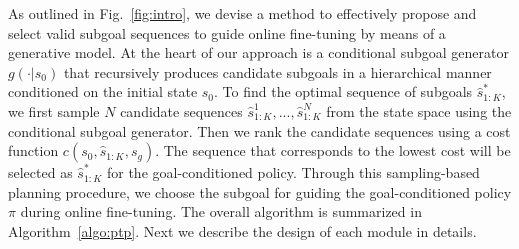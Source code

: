 
As outlined in Fig.~\ref{fig:intro}, we devise a method to effectively propose and select valid subgoal sequences to guide online fine-tuning by means of a generative model. At the heart of our approach is a conditional subgoal generator $g(\cdot | s_0)$ that recursively produces candidate subgoals in a hierarchical manner conditioned on the initial state $s_0$. To find the optimal sequence of subgoals $\hat{s}_{1:K}^*$, we first sample $N$ candidate sequences $\hat{s}_{1:K}^1, ..., \hat{s}_{1:K}^N$ from the state space using the conditional subgoal generator. Then we rank the candidate sequences using a cost function $c(s_0, \hat{s}_{1:K}, s_g)$. The sequence that corresponds to the lowest cost will be selected as $\hat{s}_{1:K}^*$ for the goal-conditioned policy. Through this sampling-based planning procedure, we choose the subgoal for guiding the goal-conditioned policy $\pi$ during online fine-tuning. The overall algorithm is summarized in Algorithm~\ref{algo:ptp}. Next we describe the design of each module in details.



